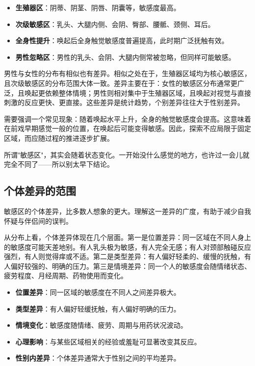 \documentclass[12pt,UTF8]{ctexbook}
\newcommand{\keyword}[1]{\textbf{#1}}
\begin{document}
\begin{itemize}
	\item \keyword{生殖器区}：阴蒂、阴茎、阴唇、阴囊等，敏感度最高。
	\item \keyword{次级敏感区}：乳头、大腿内侧、会阴、臀部、腰骶、颈侧、耳后。
	\item \keyword{全身性提升}：唤起后全身触觉敏感度普遍提高，此时期广泛抚触有效。
	\item \keyword{男性忽略区}：男性的乳头、会阴、大腿内侧常被忽略，但同样可能敏感。
\end{itemize}

男性与女性的分布有相似也有差异。相似之处在于，生殖器区域均为核心敏感区，且次级敏感区的分布范围大体一致。差异主要在于：女性的敏感区分布通常更广泛，且唤起更依赖整体情境；男性则相对集中于生殖器区域，且唤起对视觉与直接刺激的反应更快、更直接。这些差异是统计趋势，个别差异往往大于性别差异。

需要强调一个常见现象：随着唤起水平上升，全身的触觉敏感度会提高。这意味着在前戏早期感觉一般的位置，在唤起后可能变得敏感。因此，探索不应局限于固定区域，而应随过程的推进逐步扩展。

\begin{tcolorbox}[colback=pink!5!white,colframe=red!50!black,title=贴心小叮咛]
	所谓"敏感区"，其实会随着状态变化。一开始没什么感觉的地方，也许过一会儿就完全不同了——所以别太早下结论。
\end{tcolorbox}
\subsection{个体差异的范围}

敏感区的个体差异，比多数人想象的更大。理解这一差异的广度，有助于减少自我怀疑与伴侣间的误判。

从分布上看，个体差异体现在几个层面。第一是位置差异：同一区域在不同人身上的敏感度可能天差地别。有人乳头极为敏感，有人完全无感；有人对颈部触碰反应强烈，有人则觉得痒或不适。第二是类型差异：有人偏好轻柔的、缓慢的抚触，有人偏好较强的、明确的压力。第三是情境差异：同一个人的敏感度会随情绪状态、疲劳程度、月经周期、药物使用而变化。

\begin{itemize}
	\item \keyword{位置差异}：同一区域的敏感度在不同人之间差异极大。
	\item \keyword{类型差异}：有人偏好轻缓抚触，有人偏好明确的压力。
	\item \keyword{情境变化}：敏感度随情绪、疲劳、周期与用药状况波动。
	\item \keyword{心理影响}：与某些区域相关的经验或羞耻可显著改变其反应。
	\item \keyword{性别内差异}：个体差异通常大于性别之间的平均差异。
\end{itemize}
\end{document}
